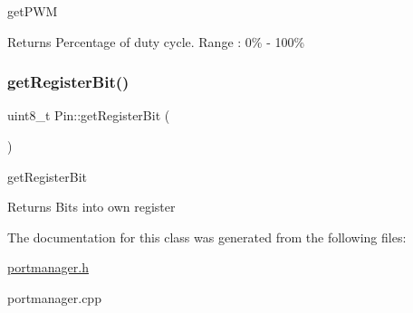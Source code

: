 get\+P\+WM 

\begin{DoxyReturn}{Returns}
Percentage of duty cycle. Range \+: 0\% -\/ 100\% 
\end{DoxyReturn}
\mbox{\label{classPin_af7d88df8c24769198ee8e022ce0ed0fd}} 
\subsubsection{\texorpdfstring{getRegisterBit()}{getRegisterBit()}}
{\footnotesize\ttfamily uint8\+\_\+t Pin\+::get\+Register\+Bit (\begin{DoxyParamCaption}{ }\end{DoxyParamCaption})}



get\+Register\+Bit 

\begin{DoxyReturn}{Returns}
Bits into own register 
\end{DoxyReturn}


The documentation for this class was generated from the following files\+:\begin{DoxyCompactItemize}
\item 
\mbox{\hyperlink{portmanager_8h}{portmanager.\+h}}\item 
portmanager.\+cpp\end{DoxyCompactItemize}
